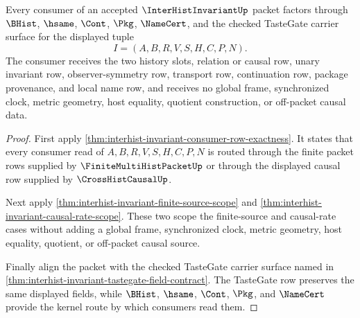 \begin{theorem}
\label{thm:interhist-invariant-consumer-kernel-scope}
Every consumer of an accepted $\InterHistInvariantUp$ packet factors through $\BHist$, $\hsame$, $\Cont$, $\Pkg$, $\NameCert$, and the checked TasteGate carrier surface for the displayed tuple
$$
I=(A,B,R,V,S,H,C,P,N).
$$
The consumer receives the two history slots, relation or causal row, unary invariant row, observer-symmetry row, transport row, continuation row, package provenance, and local name row, and receives no global frame, synchronized clock, metric geometry, host equality, quotient construction, or off-packet causal data.
\end{theorem}
\begin{proof}
First apply \autoref{thm:interhist-invariant-consumer-row-exactness}. It states that every consumer read of $A,B,R,V,S,H,C,P,N$ is routed through the finite packet rows supplied by $\FiniteMultiHistPacketUp$ or through the displayed causal row supplied by $\CrossHistCausalUp$.

Next apply \autoref{thm:interhist-invariant-finite-source-scope} and \autoref{thm:interhist-invariant-causal-rate-scope}. These two scope the finite-source and causal-rate cases without adding a global frame, synchronized clock, metric geometry, host equality, quotient, or off-packet causal source.

Finally align the packet with the checked TasteGate carrier surface named in \autoref{thm:interhist-invariant-tastegate-field-contract}. The TasteGate row preserves the same displayed fields, while $\BHist$, $\hsame$, $\Cont$, $\Pkg$, and $\NameCert$ provide the kernel route by which consumers read them.
\end{proof}

